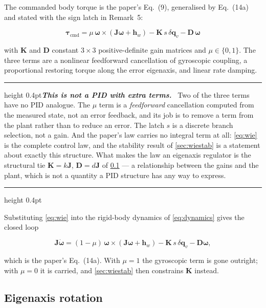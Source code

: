 \documentclass[conference,10pt,a4paper]{IEEEtran}
\newcommand{\remarkrule}{\par\nobreak\vspace{2pt}%
  \hrule height 0.4pt\vspace{4pt}\nobreak}
\newenvironment{keybox}[1][Result]
  {\par\medskip\remarkrule\noindent\small\textbf{\textit{#1.}}\ \ignorespaces}
  {\par\vspace{3pt}\hrule height 0.4pt\par\medskip\ignorespacesafterend}
\newenvironment{eqbox}{\ignorespaces}{\ignorespacesafterend}
\newcommand{\vect}[1]{\bm{#1}}
\newcommand{\mat}[1]{\bm{#1}}
\begin{document}
The commanded body torque is the paper's Eq.~(9), generalised by Eq.~(14a) and
stated with the sign latch in Remark~5:

\begin{eqbox}
\begin{equation}
\vect{\tau}_\text{cmd}
 = \mu\,\vect{\omega}\times\!\left(\mat{J}\vect{\omega}+\vect{h}_w\right)
 - \mat{K}\,s\,\delta\vect{q}_v
 - \mat{D}\,\vect{\omega}
\label{eq:wie}
\end{equation}
\end{eqbox}

with $\mat{K}$ and $\mat{D}$ constant $3\times3$ positive-definite gain
matrices and $\mu\in\{0,1\}$. The three terms are a nonlinear feedforward
cancellation of gyroscopic coupling, a proportional restoring torque along the
error eigenaxis, and linear rate damping.

\begin{keybox}[This is not a PID with extra terms]
Two of the three terms have no PID analogue. The $\mu$ term is a
\emph{feedforward} cancellation computed from the measured state, not an error
feedback, and its job is to remove a term from the plant rather than to reduce
an error. The latch $s$ is a discrete branch selection, not a gain. And the
paper's law carries no integral term at all: \cref{eq:wie} is the complete
control law, and the stability result of \cref{sec:wiestab} is a statement
about exactly this structure. What makes the law an eigenaxis regulator is the
structural tie $\mat{K}=k\mat{J}$, $\mat{D}=d\mat{J}$ of
\cref{sec:eigenaxis} --- a relationship between the gains and the plant, which
is not a quantity a PID structure has any way to express.
\end{keybox}

Substituting \cref{eq:wie} into the rigid-body dynamics of
\cref{eq:dynamics} gives the closed loop

\begin{equation}
\mat{J}\dot{\vect{\omega}}
 = (1-\mu)\,\vect{\omega}\times\!\left(\mat{J}\vect{\omega}+\vect{h}_w\right)
 - \mat{K}\,s\,\delta\vect{q}_v - \mat{D}\vect{\omega},
\label{eq:wieclosed}
\end{equation}

which is the paper's Eq.~(14a). With $\mu=1$ the gyroscopic term is gone
outright; with $\mu=0$ it is carried, and \cref{sec:wiestab} then constrains
$\mat{K}$ instead.

\subsection{Eigenaxis rotation}
\label{sec:eigenaxis}
\end{document}
